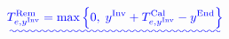 \documentclass[preprint,12pt]{elsarticle}
\providecommand{\DIFadd}[1]{{\protect\color{blue}\uwave{#1}}} %
\providecommand{\DIFaddbegin}{} %
\providecommand{\DIFaddend}{} %
\providecommand{\DIFdelbegin}{} %
\providecommand{\DIFdelend}{} %
\begin{document}
    \DIFdelbegin %
\DIFdelend \DIFaddbegin \begin{equation}
        \DIFadd{T^\text{Rem}_{e,y^\text{Inv}} = \max\left\{0,\; y^\text{Inv} + T^\text{Cal}_{e,y^\text{Inv}} - y^\text{End}\right\}
        \label{eq:salvage_remaining_life}
    }\end{equation}
\DIFaddend 
\end{document}

